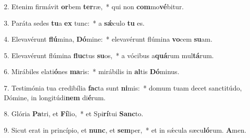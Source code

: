 
2. Etenim firmávit \textbf{or}bem \textbf{ter}ræ,~* qui non \textbf{com}mo\textbf{vé}bitur.

3. Paráta sedes \textbf{tu}a \textbf{ex} tunc:~* a \textbf{s\'{\ae}}culo \textbf{tu} es.

4. Elevavérunt \textbf{flú}mina, \textbf{Dó}mine:~* elevavérunt flúmina \textbf{vo}cem \textbf{su}am.

5. Elevavérunt flúmina \textbf{fluc}tus \textbf{su}os,~* a vócibus a\textbf{quá}rum mul\textbf{tá}rum.

6. Mirábiles elati\textbf{ó}nes \textbf{ma}ris:~* mirábilis in \textbf{al}tis \textbf{Dó}minus.

7. Testimónia tua credibília \textbf{fac}ta sunt \textbf{ni}mis:~* domum tuam decet sanctitúdo, Dómine, in longitúdi\textbf{nem} di\textbf{é}rum.

8. Glória \textbf{Pa}tri, et \textbf{Fí}lio,~* et Spi\textbf{rí}tui \textbf{Sanc}to.

9. Sicut erat in princípio, et \textbf{nunc}, et \textbf{sem}per,~* et in s\'{\ae}cula sæcu\textbf{ló}rum. \textbf{A}men.